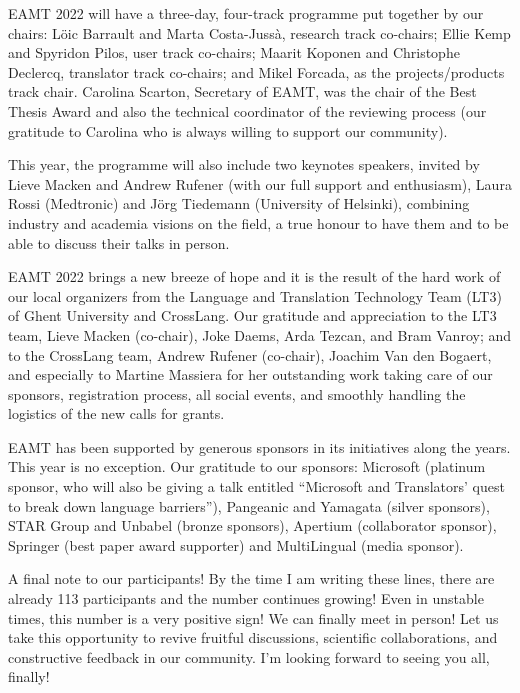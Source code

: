 \documentclass[a4paper,11pt,twoside]{book}
\begin{document}
\begin{onehalfspacing}
EAMT 2022 will have a three-day, four-track programme put together by our chairs: Löic Barrault and Marta Costa-Jussà, research track co-chairs; Ellie Kemp and Spyridon Pilos, user track co-chairs; Maarit Koponen and Christophe Declercq, translator track co-chairs; and Mikel Forcada, as the projects/products track chair. Carolina Scarton, Secretary of EAMT, was the chair of the Best Thesis Award and also the technical coordinator of the reviewing process (our gratitude to Carolina who is always willing to support our community).

This year, the programme will also include two keynotes speakers, invited by Lieve Macken and Andrew Rufener (with our full support and enthusiasm), Laura Rossi (Medtronic) and Jörg Tiedemann (University of Helsinki), combining industry and academia visions on the field, a true honour to have them and to be able to discuss their talks in person.

EAMT 2022 brings a new breeze of hope and it is the result of the hard work of our local organizers from the Language and Translation Technology Team (LT3) of Ghent University and CrossLang. Our gratitude and appreciation to the LT3 team, Lieve Macken (co-chair), Joke Daems, Arda Tezcan, and Bram Vanroy; and to the CrossLang team, Andrew Rufener (co-chair), Joachim Van den Bogaert, and especially to Martine Massiera for her outstanding work taking care of our sponsors, registration process, all social events, and smoothly handling the logistics of the new calls for grants. 

EAMT has been supported by generous sponsors in its initiatives along the years. This year is no exception. Our gratitude to our sponsors: Microsoft (platinum sponsor, who will also be giving a talk entitled ``Microsoft and Translators' quest to break down language barriers''), Pangeanic and Yamagata (silver sponsors), STAR Group and Unbabel (bronze sponsors), Apertium (collaborator sponsor), Springer (best paper award supporter) and MultiLingual (media sponsor).

A final note to our participants! By the time I am writing these lines, there are already 113 participants and the number continues growing! Even in unstable times, this number is a very positive sign! We can finally meet in person! Let us take this opportunity to revive fruitful discussions, scientific collaborations, and constructive feedback in our community. I'm looking forward to seeing you all, finally!


\end{onehalfspacing}
\end{document}
